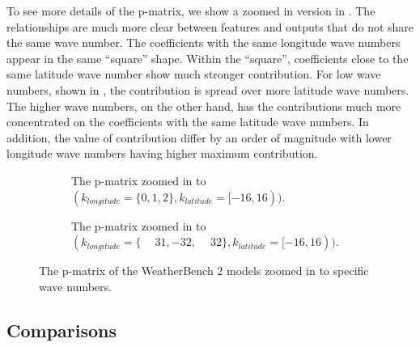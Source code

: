 To see more details of the p-matrix, we show a zoomed in version in . The relationships are much more clear between features and outputs that do not share the same wave number. The coefficients with the same longitude wave numbers appear in the same \enquote{square} shape. Within the \enquote{square}, coefficients close to the same latitude wave number show much stronger contribution. For low wave numbers, shown in , the contribution is spread over more latitude wave numbers. The higher wave numbers, on the other hand, has the contributions much more concentrated on the coefficients with the same latitude wave numbers. In addition, the value of contribution differ by an order of magnitude with lower longitude wave numbers having higher maximum contribution.
\begin{figure}[H]
  \centering
  \begin{subfigure}{\linewidth}
    \begin{adjustbox}{width=\linewidth}
      
    \end{adjustbox}
    \caption{The p-matrix zoomed in to \((k_{longitude}=\{0, 1, 2\}, k_{latitude}=[-16, 16))\).}\label{fig:sc3_pm_zoom1}
  \end{subfigure}
  \begin{subfigure}{\linewidth}
    \begin{adjustbox}{width=\linewidth}
      
    \end{adjustbox}
    \caption{The p-matrix zoomed in to \((k_{longitude}=\{\phantom{-}31,-32,\phantom{-}32\}, k_{latitude}=[-16, 16))\).}\label{fig:sc3_pm_zoom2}
  \end{subfigure}
  \caption{The p-matrix of the WeatherBench 2 models zoomed in to specific wave numbers.}\label{fig:sc3_pm_zoomed}
\end{figure}

\subsection{Comparisons}

